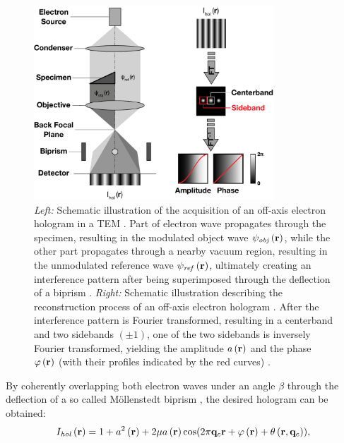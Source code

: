 \begin{figure}[H]
	\centering
	\includegraphics[width=0.8\textwidth]{Figures/Schematics/Theoretical Foundations/TEM-off-axis-holography-setup.pdf}
	\caption{\emph{Left:} Schematic illustration of the acquisition of an off-axis electron hologram in a TEM \cite{Lehmann1994,Voelkl1995,Voelkl1999,Lehmann2002,Lichte2008}. Part of electron wave propagates through the specimen, resulting in the modulated object wave ${\psi}_{\mathit{obj}}\left(\vb{r}\right)$, while the other part propagates through a nearby vacuum region, resulting in the unmodulated reference wave ${\psi}_{\mathit{ref}}\left(\vb{r}\right)$, ultimately creating an interference pattern after being superimposed through the deflection of a biprism \cite{Moellenstedt1956,Lehmann1994,Voelkl1995,Voelkl1999,Lehmann2002,Lichte2008}. \emph{Right:} Schematic illustration describing the reconstruction process of an off-axis electron hologram \cite{Lehmann1994,Voelkl1995,Voelkl1999,Lehmann2002,Lichte2008}. After the interference pattern is Fourier transformed, resulting in a centerband and two sidebands $\left(\pm 1\right)$, one of the two sidebands is inversely Fourier transformed, yielding the amplitude $a\left(\vb{r}\right)$ and the phase $\varphi\left(\vb{r}\right)$ (with their profiles indicated by the red curves) \cite{Lehmann1994,Voelkl1995,Voelkl1999,Lehmann2002,Lichte2008}.}
	\label{fig:TEM-off-axis-holography-setup}
\end{figure}
By coherently overlapping both electron waves under an angle $\beta$ through the deflection of a so called Möllenstedt biprism \cite{Moellenstedt1956}, the desired hologram can be obtained:
\begin{equation}
	I_{\mathit{hol}}\left(\vb{r}\right) = 1 + a^2\left(\vb{r}\right) + 2\mu a\left(\vb{r}\right)\cos(2\pi \vb{q}_c\vb{r} + \varphi\left(\vb{r}\right) + \theta\left(\vb{r},\vb{q}_c\right)),
\end{equation}
